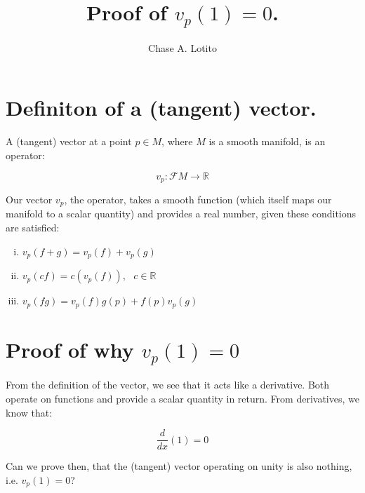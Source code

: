 \documentclass{article}
\title{Proof of \(v_p(1) = 0\).}
\author{Chase A. Lotito}
\begin{document}
\maketitle{}

\section{Definiton of a (tangent) vector.}

A (tangent) vector at a point \(p \in M\), where \(M\) is a smooth manifold, is an operator:

\begin{equation*}
    v_p : \mathcal{F}M \to \mathbb{R}
\end{equation*}

\noindent
Our vector \(v_p\), the operator, takes a smooth function (which itself maps our manifold to a scalar quantity) and provides a real number, given these conditions are satisfied:

\begin{enumerate}[i.]
    \item \( v_p (f + g) = v_p(f) + v_p(g) \)
    \item \( v_p (cf) = c (v_p(f)), ~~~ c \in \mathbb{R} \)
    \item \( v_p(fg) = v_p(f)g(p) + f(p)v_p(g) \)
\end{enumerate}

\section{Proof of why \(v_p(1) = 0\)}

From the definition of the vector, we see that it acts like a derivative. Both operate on functions and provide a scalar quantity in return. From derivatives, we know that:

\begin{equation*}
    \frac{d}{dx}(1) = 0
    \label{eq:derivative-of-one}
\end{equation*}

\noindent
Can we prove then, that the (tangent) vector operating on unity is also nothing, i.e. \(v_p(1) = 0\)?
\end{document}
